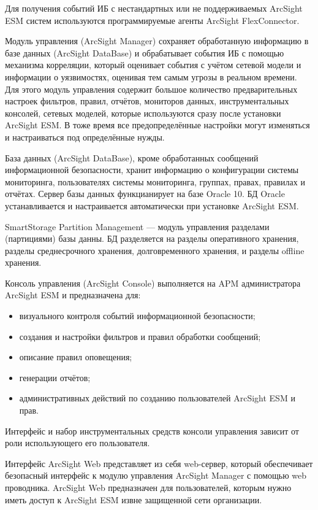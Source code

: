 Для получения событий ИБ с нестандартных или не поддерживаемых ArcSight ESM систем используются программируемые агенты ArcSight FlexConnector.

Модуль управления (ArcSight Manager) сохраняет обработанную информацию в базе данных (ArcSight DataBase) и обрабатывает события ИБ с помощью механизма корреляции, который оценивает события с учётом сетевой модели и информации о уязвимостях, оценивая тем самым угрозы в реальном времени. Для этого модуль управления содержит большое количество предварительных настроек фильтров, правил, отчётов, мониторов данных, инструментальных консолей, сетевых моделей, которые используются сразу после установки ArcSight ESM. В тоже время все предопределённые настройки могут изменяться и настраиваться под определённые нужды.

База данных (ArcSight DataBase), кроме обработанных сообщений информационной безопасности, хранит информацию о конфигурации системы мониторинга, пользователях системы мониторинга, группах, правах, правилах и отчётах. Сервер базы данных функцианирует на базе Oracle 10. БД Oracle устанавливается и настраивается автоматически при установке ArcSight ESM.

SmartStorage Partition Management --- модуль управления разделами (партициями) базы данны. БД разделяется на разделы оперативного хранения, разделы среднесрочного хранения, долговременного хранения, и разделы offline хранения.

Консоль управления (ArcSight Console) выполняется на APM администратора ArcSight ESM и предназначена для:
\begin{itemize}
    \item визуального контроля событий информационной безопасности;
    \item создания и настройки фильтров и правил обработки сообщений;
    \item описание правил оповещения;
    \item генерации отчётов;
    \item административных действий по созданию пользователей ArcSight ESM и прав.
\end{itemize}

Интерфейс и набор инструментальных средств консоли управления зависит от роли использующего его пользователя.

Интерфейс ArcSight Web представляет из себя web-сервер, который обеспечивает безопасный интерфейс к модулю управления ArcSight Manager с помощью web проводника. ArcSight Web предназначен для пользователей, которым нужно иметь доступ к ArcSight ESM извне защищенной сети организации. 

